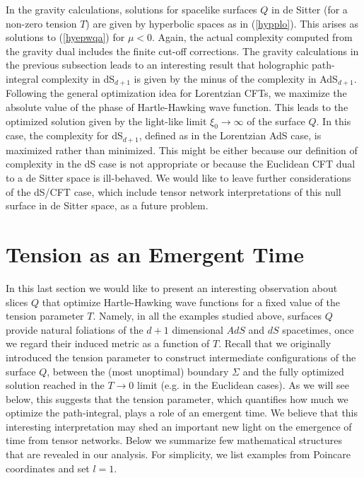 \documentclass[a4paper,12pt]{article}
\begin{document}
In the gravity calculations, solutions for spacelike surfaces $Q$ in de Sitter (for a non-zero tension $T$) are given by hyperbolic spaces as in (\ref{hypplo}). This arises as solutions to (\ref{hyepwqa}) for $\mu<0$. Again, the actual complexity computed from the gravity dual includes the finite cut-off corrections. The gravity calculations in the previous subsection leads to an interesting result that holographic path-integral complexity in dS$_{d+1}$ is given by the minus of the complexity in AdS$_{d+1}$. Following the general optimization idea for Lorentzian CFTs, we 
maximize the absolute value of the phase of Hartle-Hawking wave function.
This leads to the optimized solution  given by the light-like limit $\xi_0\to \infty$ of the surface $Q$. 
In this case, the complexity for dS$_{d+1}$, defined as in the Lorentzian AdS case, is maximized rather than minimized. This might be either because our definition of complexity in the dS case is not appropriate or 
because the Euclidean CFT dual to a de Sitter space is ill-behaved.  
We would like to leave further considerations of the dS/CFT case, which include
tensor network interpretations of this null surface in de Sitter space, as a future problem. 

\section{Tension as an Emergent Time}\label{Sec:Tension}
In this last section we would like to present an interesting observation about slices $Q$ that optimize Hartle-Hawking wave functions for a fixed value of the tension parameter $T$. Namely, in all the examples studied above, surfaces $Q$ provide natural foliations of the $d+1$ dimensional $AdS$ and $dS$ spacetimes, once we regard their induced metric as a function of $T$. Recall that we originally introduced the tension parameter to construct intermediate configurations of the surface $Q$, between the (most unoptimal) boundary $\Sigma$ and the fully optimized solution reached in the $T\to 0$ limit (e.g. in the Euclidean cases). As we will see below, this suggests that the tension parameter, which quantifies how much we optimize the path-integral, plays a role of an emergent time. We believe that this interesting interpretation may shed an important new light on the emergence of time from tensor networks. Below we summarize few mathematical structures that are revealed in our analysis. For simplicity, we list examples from Poincare coordinates and set $l=1$.
\end{document}
